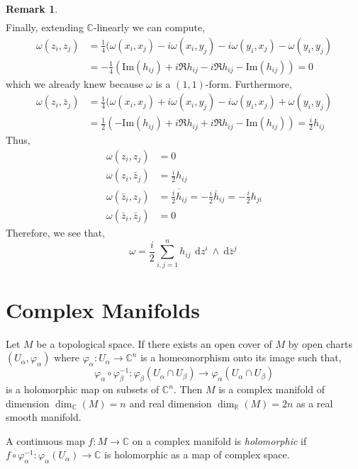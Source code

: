 \documentclass[12pt]{extarticle}
\newcommand{\R}{\mathbb{R}}
\newcommand{\C}{\mathbb{C}}
\renewcommand{\Im}[1]{\mathrm{Im}(#1)}
\renewcommand{\d}[1]{\: \mathrm{d}#1 \:}
\theoremstyle{definition}
\newtheorem{remark}{Remark}
\newenvironment{definition}[1][Definition:]{\begin{trivlist}
\item[\hskip \labelsep {\bfseries #1}]}{\end{trivlist}}
\begin{document}
\begin{remark}
\begin{align*}
\end{align*}
Finally, extending $\C$-linearly we can compute,
\begin{align*}
\omega(z_i, z_j) & = \tfrac{1}{4} (\omega(x_i, x_j) - i \omega(x_i, y_j) - i \omega(y_i, x_j) - \omega(y_i, y_j) 
\\
& = - \tfrac{1}{4} (\Im{h_{ij}} + i \Re{h_{ij}} - i \Re{h_{ij}} - \Im{h_{ij}}) = 0
\end{align*}
which we already knew because $\omega$ is a $(1,1)$-form. Furthermore, 
\begin{align*}
\omega(z_i, \bar{z}_j) & = \tfrac{1}{4} (\omega(x_i, x_j) + i \omega(x_i, y_j) - i \omega(y_i, x_j) + \omega(y_i, y_j) 
\\
& = \tfrac{1}{2} (-\Im{h_{ij}} + i \Re{h_{ij}} + i \Re{h_{ij}} - \Im{h_{ij}}) = \tfrac{i}{2} h_{ij}
\end{align*}
Thus,
\begin{align*}
\omega(z_i, z_j) & = 0
\\
\omega(z_i, \bar{z}_j) & = \tfrac{i}{2} h_{ij}
\\
\omega(\bar{z}_i, z_j) & = \overline{\tfrac{i}{2} h_{ij}} = - \tfrac{i}{2} \bar{h}_{ij} = - \tfrac{i}{2} h_{ji}
\\
\omega(\bar{z}_i, \bar{z}_j) & = 0
\end{align*}
Therefore, we see that,
\[ \omega = \frac{i}{2} \sum_{i,j = 1}^n h_{ij} \, \d{z^i} \wedge \d{\bar{z}^j} \]
\end{remark}


\section{Complex Manifolds}

\begin{definition}
Let $M$ be a topological space. If there exists an open cover of $M$ by open charts $(U_\alpha, \varphi_\alpha)$ where $\varphi_\alpha : U_\alpha \to \C^n$ is a homeomorphism onto its image such that,
\[ \varphi_\alpha \circ \varphi^{-1}_\beta : \varphi_\beta(U_\alpha \cap U_\beta) \to \varphi_\alpha(U_\alpha \cap U_\beta) \]
is a holomorphic map on subsets of $\C^n$. Then $M$ is a complex manifold of dimension $\dim_{\C}(M) = n$ and real dimension $\dim_{\R}(M) = 2n$ as a real smooth manifold. 
\end{definition}

\begin{definition}
A continuous map $f : M \to \C$ on a complex manifold is \textit{holomorphic} if $f \circ \varphi_{\alpha}^{-1} : \varphi_\alpha(U_\alpha) \to \C$ is holomorphic as a map of complex space. 
\end{definition}
\end{document}
